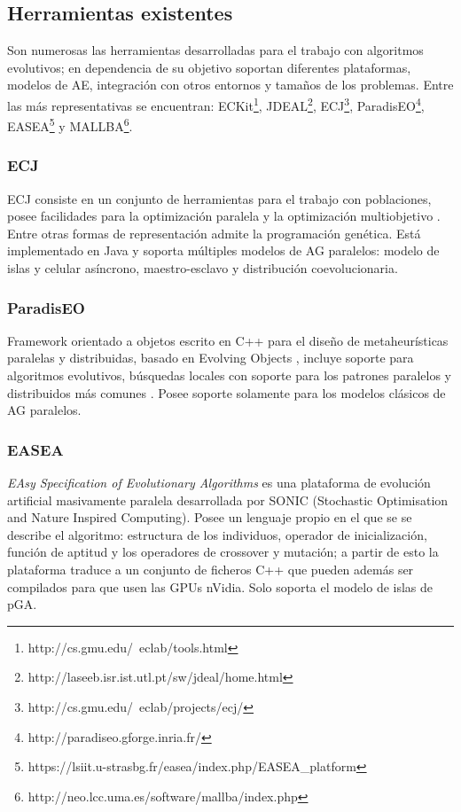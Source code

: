 \documentclass[runningheads]{llncs}
\begin{document}
\subsection{Herramientas existentes}

Son numerosas las herramientas desarrolladas para el trabajo con algoritmos evolutivos; en dependencia de su objetivo soportan diferentes plataformas, modelos de AE, integración con otros entornos y tamaños de los problemas. Entre las más representativas se encuentran: ECKit\footnote{http://cs.gmu.edu/~eclab/tools.html}, JDEAL\footnote{http://laseeb.isr.ist.utl.pt/sw/jdeal/home.html}, ECJ\footnote{http://cs.gmu.edu/~eclab/projects/ecj/}, ParadisEO\footnote{http://paradiseo.gforge.inria.fr/}, EASEA\footnote{https://lsiit.u-strasbg.fr/easea/index.php/EASEA\_platform} y MALLBA\footnote{http://neo.lcc.uma.es/software/mallba/index.php}.


\subsubsection{ECJ}

ECJ consiste en un conjunto de herramientas para el trabajo con poblaciones, posee facilidades para la optimización paralela y la optimización multiobjetivo \cite{Luke2010}. Entre otras formas de representación admite la programación genética. Está implementado en Java y soporta múltiples modelos de AG paralelos: modelo de islas y celular asíncrono, maestro-esclavo y distribución coevolucionaria.

\subsubsection{ParadisEO}

Framework orientado a objetos escrito en C++ para el diseño de metaheurísticas paralelas y distribuidas, basado en Evolving Objects \cite{Keijzer2001}, incluye soporte para algoritmos evolutivos, búsquedas locales con soporte para los patrones paralelos y distribuidos más comunes \cite{PARADISEO}. Posee soporte solamente para los modelos clásicos de AG paralelos.


\subsubsection{EASEA}

\emph{EAsy Specification of Evolutionary Algorithms} es una plataforma de evolución artificial masivamente paralela desarrollada por SONIC (Stochastic Optimisation and Nature Inspired Computing). Posee un lenguaje propio en el que se se describe el algoritmo: estructura de los individuos, operador de inicialización, función de aptitud y los operadores de crossover y mutación; a partir de esto la plataforma traduce a un conjunto de ficheros C++ que pueden además ser compilados para que usen las GPUs nVidia. Solo soporta el modelo de islas de pGA.
\end{document}
